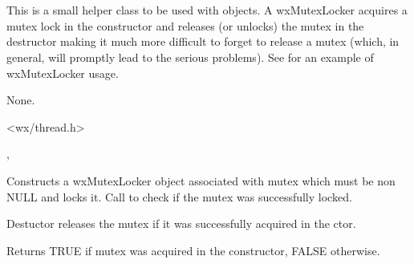 \section{}\label{wxmutexlocker}

This is a small helper class to be used with  
objects. A wxMutexLocker acquires a mutex lock in the constructor and releases
(or unlocks) the mutex in the destructor making it much more difficult to
forget to release a mutex (which, in general, will promptly lead to the serious
problems). See  for an example of wxMutexLocker
usage.


None.


<wx/thread.h>


, 


\label{wxmutexlockerctor}


Constructs a wxMutexLocker object associated with mutex which must be non NULL
and locks it. Call  to check if the mutex was
successfully locked.

\label{wxmutexlockerdtor}


Destuctor releases the mutex if it was successfully acquired in the ctor.

\label{wxmutexlockerisok}


Returns TRUE if mutex was acquired in the constructor, FALSE otherwise.

